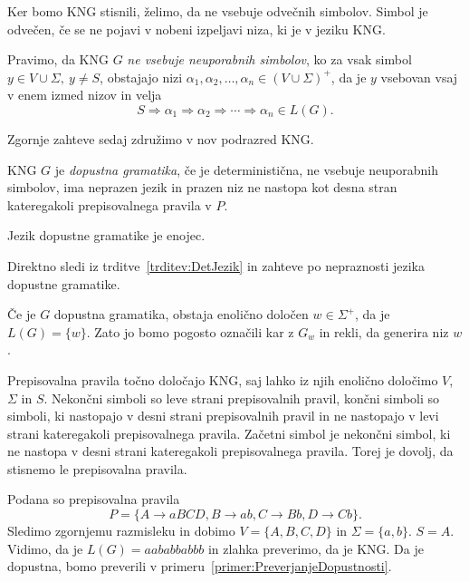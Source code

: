 \documentclass[fin1, tisk]{fmfdelo}
\theoremstyle{definition}
\begin{document}
Ker bomo KNG stisnili, želimo, da ne vsebuje odvečnih simbolov. Simbol je odvečen, če se
ne pojavi v nobeni izpeljavi niza, ki je v jeziku KNG.

\begin{definicija}
    Pravimo, da KNG $G$ \emph{ne vsebuje neuporabnih simbolov}, 
    ko za vsak simbol $ y \in V \cup \Sigma, \ y \neq S $, obstajajo nizi
    $ \alpha_1, \alpha_2, \ldots, \alpha_n \in (V \cup \Sigma)^+ $, da je $y$ vsebovan vsaj
    v enem izmed nizov in velja
    \[
        S \Rightarrow \alpha_1 \Rightarrow \alpha_2 \Rightarrow \cdots \Rightarrow \alpha_n \in L(G).
    \]
\end{definicija}

Zgornje zahteve sedaj združimo v nov podrazred KNG. 

\begin{definicija}
    KNG $G$ je \emph{dopustna gramatika}, če je deterministična, ne vsebuje neuporabnih simbolov,
    ima neprazen jezik in prazen niz ne nastopa kot desna stran kateregakoli prepisovalnega 
    pravila v $P$.
\end{definicija}

\begin{posledica}
    Jezik dopustne gramatike je enojec. 
\end{posledica}

\begin{dokaz}
    Direktno sledi iz trditve~\ref{trditev:DetJezik} in zahteve po nepraznosti jezika dopustne 
    gramatike.
\end{dokaz}

Če je $G$ dopustna gramatika, obstaja enolično določen $w \in \Sigma^+$, da je
$L(G) = \{ w \}$. Zato jo bomo pogosto označili kar z $G_w$ in rekli, da generira niz $w$.

Prepisovalna pravila točno določajo KNG, saj lahko iz njih enolično določimo $V$, $\Sigma$ in $S$.
Nekončni simboli so leve strani prepisovalnih pravil, končni simboli so simboli, ki nastopajo
v desni strani prepisovalnih pravil in ne nastopajo v levi strani kateregakoli prepisovalnega
pravila. Začetni simbol je nekončni simbol, ki ne nastopa v desni strani kateregakoli 
prepisovalnega pravila. Torej je dovolj, da stisnemo le prepisovalna pravila.

\begin{primer}\label{primer:dopustna}
    Podana so prepisovalna pravila
    \[
        P = \{ A \rightarrow \mathit{aBCD}, B \rightarrow \mathit{ab}, C \rightarrow 
        \mathit{Bb}, D \rightarrow \mathit{Cb} \}.
    \]
    Sledimo zgornjemu razmisleku in dobimo $V = \{ A, B, C, D \}$ in $\Sigma = \{ a, b \}$.
    $S = A$. Vidimo, da je $L(G) = \mathit{aababbabbb}$ in  zlahka preverimo, da je KNG. Da je dopustna,
    bomo preverili v primeru~\ref{primer:PreverjanjeDopustnosti}.
\end{primer}
\end{document}
